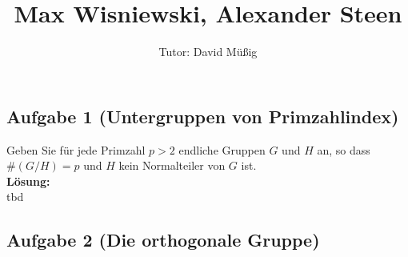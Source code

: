 \documentclass[11pt,a4paper,ngerman]{article}
\author{Tutor: David Müßig}
\date{}
\title{Max Wisniewski, Alexander Steen}
\begin{document}

\maketitle
\thispagestyle{fancy}


\subsection*{Aufgabe 1 \mdseries (Untergruppen von Primzahlindex)}

Geben Sie für jede Primzahl $p > 2$ endliche Gruppen $G$ und $H$ an, so dass $\# (G / H) = p$ und $H$ kein Normalteiler von $G$ ist.\\

\textbf{Lösung:}\\

tbd


\subsection*{Aufgabe 2 \mdseries (Die orthogonale Gruppe)}
\end{document}
